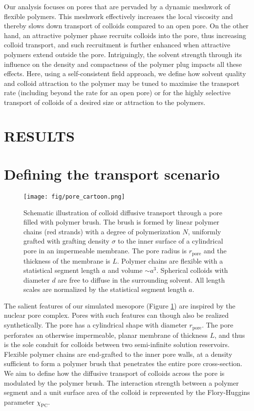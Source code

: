 \documentclass[12pt, a4paper]{article}
\begin{document}

Our analysis focuses on pores that are pervaded by a dynamic meshwork of flexible polymers. 
This meshwork effectively increases the local viscosity and thereby slows down transport of colloids compared to an open pore. 
On the other hand, an attractive polymer phase recruits colloids into the pore, thus increasing colloid transport, 
and such recruitment is further enhanced when attractive polymers extend outside the pore. 
Intriguingly, the solvent strength through its influence on the density and compactness of the polymer plug impacts all these effects. 
Here, using a self-consistent field approach, we define how solvent quality and colloid attraction to the polymer may be tuned 
to maximise the transport rate (including beyond the rate for an open pore) or for the highly selective transport of colloids of a desired size or attraction to the polymers.


\section{RESULTS}


\section{Defining the transport scenario}

\begin{figure}
    \centering
    \texttt{[image: fig/pore\_cartoon.png]}
    \caption{
        Schematic illustration of colloid diffusive transport through a pore filled with polymer brush. 
        The brush is formed by linear polymer chains (red strands) with a degree of polymerization $N$, uniformly grafted with grafting density $\sigma$ 
        to the inner surface of a cylindrical pore in an impermeable membrane. The pore radius is $r_{\text{pore}}$ and the thickness of the membrane is $L$.
        Polymer chains are flexible with a statistical segment length $a$ and volume $\sim a^3$. 
        Spherical colloids with diameter $d$ are free to diffuse in the surrounding solvent.
        All length scales are normalized by the statistical segment length $a$.
        }
    \label{fig:colloid_transport}
\end{figure}

The salient features of our simulated mesopore (Figure \ref{fig:colloid_transport}) are inspired by the nuclear pore complex.
Pores with such features can though also be realized synthetically.
The pore has a cylindrical shape with diameter $r_{\text{pore}}$.
The pore perforates an otherwise impermeable, planar membrane of thickness $L$, and thus is the sole conduit for colloids between two semi-infinite solution reservoirs.
Flexible polymer chains are end-grafted to the inner pore walls, at a density sufficient to form a polymer brush that penetrates the entire pore cross-section.
We aim to define how the diffusive transport of colloids across the pore is modulated by the polymer brush. 
The interaction strength between a polymer segment and a unit surface area of the colloid is represented by the Flory-Huggins parameter $\chi_{\text{PC}}$. 
\end{document}
